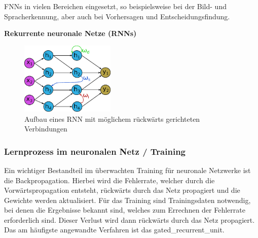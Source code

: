 FNNs in vielen Bereichen eingesetzt, so beispielsweise bei der Bild- und Spracherkennung, aber auch bei Vorhersagen und Entscheidungsfindung.\vspace{0.2cm}

\textbf{Rekurrente neuronale Netze (RNNs)}\vspace{0.2cm}

\begin{figure}[!ht]
	\includegraphics[width=0.4\textwidth]{content/chapter_basics/images/neuronal_network_rnn.eps}
	\centering
	\caption{Aufbau eines RNN mit möglichem rückwärts gerichteten Verbindungen}
	\label{img:neural_network_rnn}
\end{figure}





\subsubsection{Lernprozess im neuronalen Netz / Training}

Ein wichtiger Bestandteil im überwachten Training für neuronale Netzwerke ist die Backpropagation. Hierbei wird die Fehlerrate, welcher durch die Vorwärtspropagation entsteht, rückwärts durch das Netz propagiert und die Gewichte werden aktualisiert. Für das Training sind Trainingsdaten notwendig, bei denen die Ergebnisse bekannt sind, welches zum Errechnen der Fehlerrate erforderlich sind. Dieser Verlust wird dann rückwärts durch das Netz propagiert. Das am häufigste angewandte Verfahren ist das \gls{gated_recurrent_unit}.\vspace{0.2cm}

